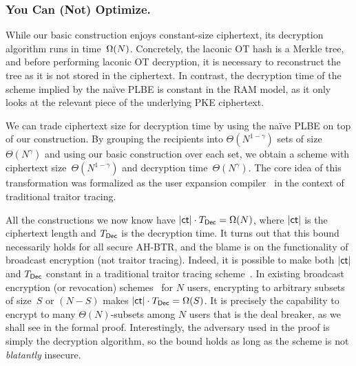 \subsubsection{You Can (Not) Optimize.}
While our basic construction enjoys constant-size ciphertext,
its decryption algorithm runs in time~$\operatorname{\Omega}(N)$.
Concretely, the laconic OT hash is a Merkle tree, and before performing laconic OT decryption, it is necessary to reconstruct the tree as it is not stored in the ciphertext.
In contrast, the decryption time of the scheme implied by the na{\"i}ve PLBE is constant in the RAM model, as it only looks at the relevant piece of the underlying PKE ciphertext.

We can trade ciphertext size for decryption time by using the na{\"i}ve PLBE on top of our construction.
By grouping the recipients into $\Theta(N^{1-\gamma})$ sets of size~$\Theta(N^\gamma)$ and using our basic construction over each set, we obtain a scheme with ciphertext size~$\Theta(N^{1-\gamma})$ and decryption time~$\Theta(N^\gamma)$.
The core idea of this transformation was formalized as the user expansion compiler~\cite{C:Zhandry20} in the context of traditional traitor tracing.

All the constructions we now know have ${|\ct|\cdot T_\Dec=\bigOmega(N)}$,
where $|\ct|$ is the ciphertext length and $T_\Dec$ is the decryption time.
It turns out that this bound necessarily holds for all secure AH-BTR, and
the blame is on the functionality of broadcast encryption (not traitor tracing).
Indeed, 
it is possible to make both $|\ct|$ and $T_\Dec$ constant in a traditional traitor tracing scheme~\cite{C:BonZha14}.
In existing broadcast encryption (or revocation) schemes~\cite{C:BonGenWat05,AC:Delerablee07,EC:GenWat09,C:BonZha14,EC:AgrYam20,TCC:AgrWicYam20,EPRINT:BraVai20} for $N$ users,
encrypting to arbitrary subsets of size~$S$ or $({N-S})$ makes ${|\ct|\cdot T_\Dec=\Omega(S)}$.
It is precisely the capability to encrypt to many $\Theta(N)$-subsets among $N$ users that is the deal breaker, as we shall see in the formal proof.
Interestingly,
the adversary used in the proof is simply the decryption algorithm,
so the bound holds as long as the scheme is not \emph{blatantly} insecure.

